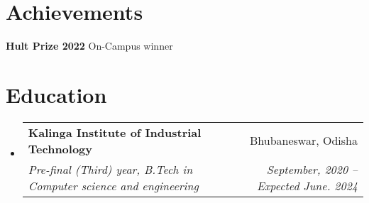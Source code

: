 \documentclass[letterpaper,11pt]{article}
\makeatletter
\newcommand{\resumeSubheading}[4]{
  \vspace{-2pt}\item
    \begin{tabular*}{0.97\textwidth}[t]{l@{\extracolsep{\fill}}r}
      \textbf{#1} & #2 \\
      \textit{\small#3} & \textit{\small #4} \\
    \end{tabular*}\vspace{-7pt}
}
\newcommand{\resumeSubHeadingListStart}{\begin{itemize}[leftmargin=0.15in, label={}]}
\newcommand{\resumeSubHeadingListEnd}{\end{itemize}}
\makeatother
\begin{document}

\section{Achievements}
\begin{itemize}[leftmargin=0.15in, label={}]
	\small{\item{
		\textbf{Hult Prize 2022}{ On-Campus winner } \\
	}}
\end{itemize}
 
\section{Education}
  \resumeSubHeadingListStart
    \resumeSubheading
      {Kalinga Institute of Industrial Technology}{Bhubaneswar, Odisha}
      {Pre-final (Third) year, B.Tech in Computer science and engineering}{September, 2020 -- Expected June. 2024}
  \resumeSubHeadingListEnd
\end{document}
